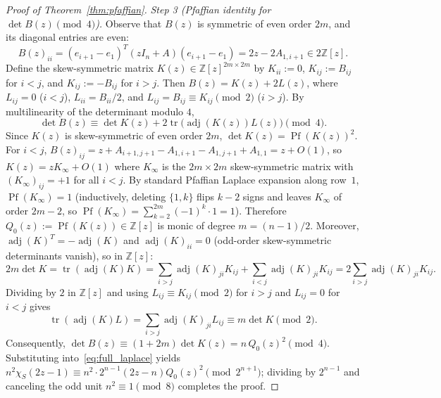 \documentclass[11pt,reqno]{amsart}
\theoremstyle{definition}
\theoremstyle{remark}
\numberwithin{equation}{section}
\numberwithin{table}{section}
\DeclareMathOperator{\tr}{tr}
\DeclareMathOperator{\adj}{adj}
\DeclareMathOperator{\Pf}{Pf}
\begin{document}
\begin{proof}[Proof of Theorem~\ref{thm:pfaffian}]
\emph{Step 3 (Pfaffian identity for $\det B(z) \pmod 4$).} Observe that $B(z)$ is symmetric of even order $2m$, and its diagonal entries are even:
\[
  B(z)_{ii} = (e_{i+1} - e_1)^T(zI_n + A)(e_{i+1} - e_1) = 2z - 2A_{1, i+1} \in 2\mathbb{Z}[z].
\]
Define the skew-symmetric matrix $K(z) \in \mathbb{Z}[z]^{2m \times 2m}$ by $K_{ii} := 0$, $K_{ij} := B_{ij}$ for $i < j$, and $K_{ij} := -B_{ij}$ for $i > j$. Then $B(z) = K(z) + 2L(z)$, where $L_{ij} = 0$ ($i < j$), $L_{ii} = B_{ii}/2$, and $L_{ij} = B_{ij} \equiv K_{ij} \pmod 2$ ($i > j$). By multilinearity of the determinant modulo $4$,
\[
  \det B(z) \equiv \det K(z) + 2\tr\!\big(\adj(K(z)) L(z)\big) \pmod{4}.
\]
Since $K(z)$ is skew-symmetric of even order $2m$, $\det K(z) = \Pf(K(z))^2$. For $i < j$, $B(z)_{ij} = z + A_{i+1, j+1} - A_{1, i+1} - A_{1, j+1} + A_{1, 1} = z + O(1)$, so $K(z) = z K_\infty + O(1)$ where $K_\infty$ is the $2m \times 2m$ skew-symmetric matrix with $(K_\infty)_{ij} = +1$ for all $i < j$. By standard Pfaffian Laplace expansion along row~$1$, $\Pf(K_\infty) = 1$ (inductively, deleting $\{1, k\}$ flips $k - 2$ signs and leaves $K_\infty$ of order $2m - 2$, so $\Pf(K_\infty) = \sum_{k=2}^{2m} (-1)^k \cdot 1 = 1$). Therefore $Q_0(z) := \Pf(K(z)) \in \mathbb{Z}[z]$ is monic of degree $m = (n - 1)/2$. Moreover, $\adj(K)^T = -\adj(K)$ and $\adj(K)_{ii} = 0$ (odd-order skew-symmetric determinants vanish), so in $\mathbb{Z}[z]$:
\[
  2m \det K = \tr(\adj(K) K) = \sum_{i > j} \adj(K)_{ji} K_{ij} + \sum_{i < j} \adj(K)_{ji} K_{ij} = 2 \sum_{i > j} \adj(K)_{ji} K_{ij}.
\]
Dividing by $2$ in $\mathbb{Z}[z]$ and using $L_{ij} \equiv K_{ij} \pmod 2$ for $i > j$ and $L_{ij} = 0$ for $i < j$ gives
\[
  \tr(\adj(K) L) = \sum_{i > j} \adj(K)_{ji} L_{ij} \equiv m \det K \pmod{2}.
\]
Consequently, $\det B(z) \equiv (1 + 2m)\det K(z) = n\,Q_0(z)^2 \pmod 4$. Substituting into~\eqref{eq:full_laplace} yields $n^2 \chi_S(2z - 1) \equiv n^2 \cdot 2^{n-1}(2z - n)Q_0(z)^2 \pmod{2^{n+1}}$; dividing by $2^{n-1}$ and canceling the odd unit $n^2 \equiv 1 \pmod 8$ completes the proof.
\end{proof}
\end{document}
